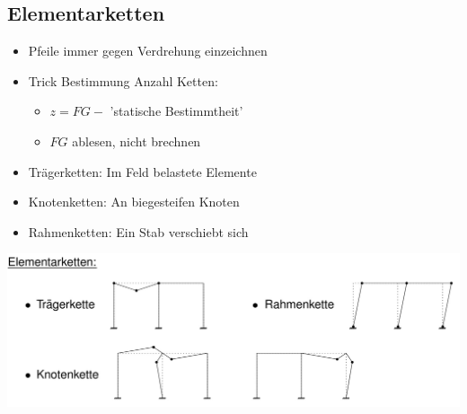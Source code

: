 \documentclass[fleqn,twoside]{article}
\begin{document}
    \subsection{Elementarketten}
        \begin{minipage}{0.5\textwidth}
            \begin{itemize}
                \item Pfeile immer gegen Verdrehung einzeichnen
                \item Trick Bestimmung Anzahl Ketten:
                    \begin{itemize}
                        \item $z=FG -$ 'statische Bestimmtheit'
                        \item $FG$ ablesen, nicht brechnen
                    \end{itemize}
                \item Trägerketten: Im Feld belastete Elemente
                \item Knotenketten: An biegesteifen Knoten
                \item Rahmenketten: Ein Stab verschiebt sich
            \end{itemize}
        \end{minipage}
        \begin{minipage}{0.5\textwidth}
            \includegraphics[scale = 0.2]{Grafiken/Elementarketten.png}
        \end{minipage}

        
\end{document}
